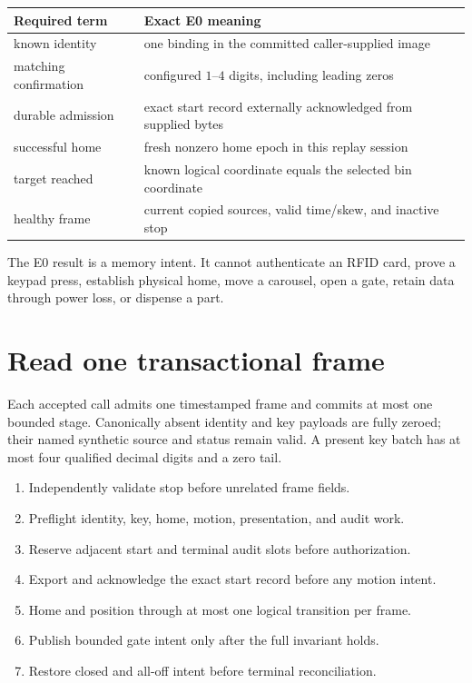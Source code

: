 \documentclass[10pt]{article}
\begin{document}
\begin{tabularx}{\linewidth}{@{}l X@{}}
\toprule
Required term & Exact E0 meaning\\
\midrule
known identity & one binding in the committed caller-supplied image\\
matching confirmation & configured \(1\)--\(4\) digits, including leading zeros\\
durable admission & exact start record externally acknowledged from supplied bytes\\
successful home & fresh nonzero home epoch in this replay session\\
target reached & known logical coordinate equals the selected bin coordinate\\
healthy frame & current copied sources, valid time/skew, and inactive stop\\
\bottomrule
\end{tabularx}

The E0 result is a memory intent. It cannot authenticate an RFID card, prove
a keypad press, establish physical home, move a carousel, open a gate, retain
data through power loss, or dispense a part.

\section{Read one transactional frame}
Each accepted call admits one timestamped frame and commits at most one
bounded stage. Canonically absent identity and key payloads are fully zeroed;
their named synthetic source and status remain valid. A present key batch has
at most four qualified decimal digits and a zero tail.

\begin{enumerate}
 \item Independently validate stop before unrelated frame fields.
 \item Preflight identity, key, home, motion, presentation, and audit work.
 \item Reserve adjacent start and terminal audit slots before authorization.
 \item Export and acknowledge the exact start record before any motion intent.
 \item Home and position through at most one logical transition per frame.
 \item Publish bounded gate intent only after the full invariant holds.
 \item Restore closed and all-off intent before terminal reconciliation.
\end{enumerate}
\end{document}
